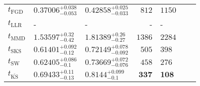 \begin{tabular}{l|llr|llr}
	\midrule
	$t_{\mathrm{FGD}}$ & ${\mathbf{0.37006_{-0.053}^{+0.038}}}$ & ${\mathbf{0.42858_{-0.033}^{+0.025}}}$ & $812$ & $1150$ \\
	$t_{\mathrm{LLR}}$ & - & - & - & - \\
	$t_{\mathrm{MMD}}$ & $1.53597_{-0.42}^{+0.32}$ & $1.81389_{-0.27}^{+0.26}$ & $1386$ & $2284$ \\
	$t_{\mathrm{SKS}}$ & $0.61401_{-0.12}^{+0.092}$ & $0.72149_{-0.092}^{+0.078}$ & $505$ & $398$ \\
	$t_{\mathrm{SW}}$ & $0.62405_{-0.1}^{+0.086}$ & $0.73669_{-0.076}^{+0.072}$ & $458$ & $276$ \\
	$t_{\overline{\mathrm{KS}}}$ & $0.69433_{-0.13}^{+0.11}$ & $0.8144_{-0.1}^{+0.099}$ & ${\mathbf{337}}$ & ${\mathbf{108}}$ \\
	\bottomrule
\end{tabular}